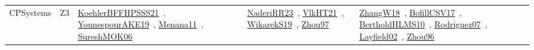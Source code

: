 {\begin{longtable}{lp{3cm}>{\raggedright\arraybackslash}p{6cm}>{\raggedright\arraybackslash}p{6cm}>{\raggedright\arraybackslash}p{8cm}}
CPSystems & Z3 & \href{works/KoehlerBFFHPSSS21.pdf}{KoehlerBFFHPSSS21}~\cite{KoehlerBFFHPSSS21}, \href{works/YounespourAKE19.pdf}{YounespourAKE19}~\cite{YounespourAKE19}, \href{works/Menana11.pdf}{Menana11}~\cite{Menana11}, \href{works/SureshMOK06.pdf}{SureshMOK06}~\cite{SureshMOK06} & \href{works/NaderiRR23.pdf}{NaderiRR23}~\cite{NaderiRR23}, \href{works/VlkHT21.pdf}{VlkHT21}~\cite{VlkHT21}, \href{works/WikarekS19.pdf}{WikarekS19}~\cite{WikarekS19}, \href{works/Zhou97.pdf}{Zhou97}~\cite{Zhou97} & \href{works/ZhangW18.pdf}{ZhangW18}~\cite{ZhangW18}, \href{works/BofillCSV17.pdf}{BofillCSV17}~\cite{BofillCSV17}, \href{works/BertholdHLMS10.pdf}{BertholdHLMS10}~\cite{BertholdHLMS10}, \href{works/Rodriguez07.pdf}{Rodriguez07}~\cite{Rodriguez07}, \href{works/Layfield02.pdf}{Layfield02}~\cite{Layfield02}, \href{works/Zhou96.pdf}{Zhou96}~\cite{Zhou96}\\
\end{longtable}
}

